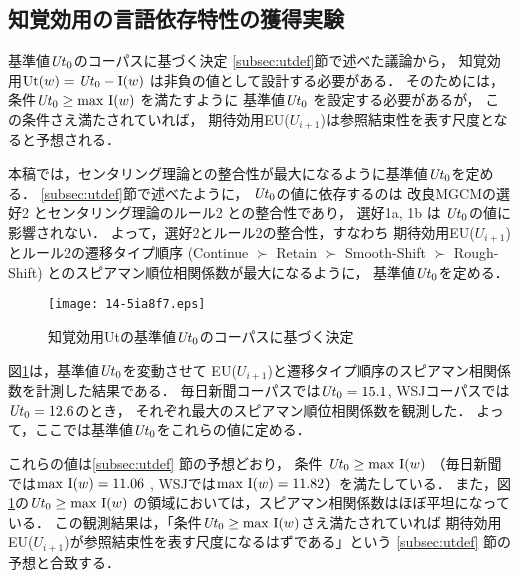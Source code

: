 \documentclass[japanese]{jnlp_1.3e}
\renewcommand{\paragraph}{}
\begin{document}
\subsection{知覚効用の言語依存特性の獲得実験}
\label{sec:verify_cost}


\paragraph{基準値${\it Ut}_0$のコーパスに基づく決定} 
\ref{subsec:utdef}節で述べた議論から，
知覚効用${\rm Ut}(w)={\it Ut}_0 - {\rm I}(w) $
は非負の値として設計する必要がある．
そのためには，
条件${\it Ut}_0 \ge {\rm max}~{\rm I}(w)$ を満たすように
基準値${\it Ut}_0$ を設定する必要があるが，
この条件さえ満たされていれば，
期待効用EU($U_{i+1}$)は参照結束性を表す尺度となると予想される．


本稿では，センタリング理論との整合性が最大になるように基準値${\it Ut}_0$を定める．
\ref{subsec:utdef}節で述べたように，
${\it Ut}_0$の値に依存するのは
改良MGCMの選好2 とセンタリング理論のルール2 との整合性であり，
選好1a, 1b は ${\it Ut}_0$の値に影響されない．
よって，選好2とルール2の整合性，すなわち
期待効用EU($U_{i+1}$)とルール2の遷移タイプ順序
(Continue $\succ$ Retain $\succ$ Smooth-Shift $\succ$ Rough-Shift)
とのスピアマン順位相関係数が最大になるように，
基準値${\it Ut}_0$を定める．

\begin{figure}[b]
\begin{center}
      \texttt{[image: 14-5ia8f7.eps]}
  \caption{知覚効用Utの基準値${\it Ut}_0$のコーパスに基づく決定}
  \label{fig:imax}
 \end{center}
\end{figure}



図\ref{fig:imax}は，基準値${\it Ut}_0$を変動させて
EU($U_{i+1}$)と遷移タイプ順序のスピアマン相関係数を計測した結果である．
毎日新聞コーパスでは${\it Ut}_0=15.1$, WSJコーパスでは${\it Ut}_0=12.6$のとき，
それぞれ最大のスピアマン順位相関係数を観測した．
よって，ここでは基準値${\it Ut}_0$をこれらの値に定める．

これらの値は\ref{subsec:utdef} 節の予想どおり，
条件 ${\it Ut}_0 \ge {\rm max}~{\rm I}(w)$ 
（毎日新聞では${\rm max}~{\rm I}(w)=11.06$  , WSJでは${\rm max}~{\rm I}(w)=11.82$）を満たしている．
また，図\ref{fig:imax}の${\it Ut}_0 \ge {\rm max}~{\rm I}(w)$ 
の領域においては，スピアマン相関係数はほぼ平坦になっている．
この観測結果は，「条件${\it Ut}_0 \ge {\rm max}~{\rm I}(w)$さえ満たされていれば
期待効用EU($U_{i+1}$)が参照結束性を表す尺度になるはずである」という
\ref{subsec:utdef} 節の予想と合致する．
\end{document}
